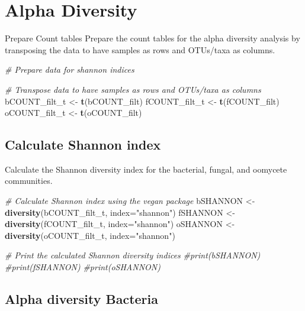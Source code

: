 \documentclass[
  11pt,
]{article}
\newenvironment{Shaded}{\begin{snugshade}}{\end{snugshade}}
\newcommand{\AttributeTok}[1]{\textcolor[rgb]{0.13,0.29,0.53}{#1}}
\newcommand{\CommentTok}[1]{\textcolor[rgb]{0.56,0.35,0.01}{\textit{#1}}}
\newcommand{\FunctionTok}[1]{\textcolor[rgb]{0.13,0.29,0.53}{\textbf{#1}}}
\newcommand{\NormalTok}[1]{#1}
\newcommand{\OtherTok}[1]{\textcolor[rgb]{0.56,0.35,0.01}{#1}}
\newcommand{\StringTok}[1]{\textcolor[rgb]{0.31,0.60,0.02}{#1}}
\begin{document}
\section{Alpha Diversity}\label{alpha-diversity}

Prepare Count tables Prepare the count tables for the alpha diversity
analysis by transposing the data to have samples as rows and OTUs/taxa
as columns.

\begin{Shaded}
\begin{Highlighting}[]
\CommentTok{\# Prepare data for shannon indices}

\CommentTok{\# Transpose data to have samples as rows and OTUs/taxa as columns}
\NormalTok{bCOUNT\_filt\_t }\OtherTok{\textless{}{-}} \FunctionTok{t}\NormalTok{(bCOUNT\_filt)}
\NormalTok{fCOUNT\_filt\_t }\OtherTok{\textless{}{-}} \FunctionTok{t}\NormalTok{(fCOUNT\_filt)}
\NormalTok{oCOUNT\_filt\_t }\OtherTok{\textless{}{-}} \FunctionTok{t}\NormalTok{(oCOUNT\_filt)}
\end{Highlighting}
\end{Shaded}

\subsection{Calculate Shannon index}\label{calculate-shannon-index}

Calculate the Shannon diversity index for the bacterial, fungal, and
oomycete communities.

\begin{Shaded}
\begin{Highlighting}[]
\CommentTok{\# Calculate Shannon index using the vegan package}
\NormalTok{bSHANNON }\OtherTok{\textless{}{-}} \FunctionTok{diversity}\NormalTok{(bCOUNT\_filt\_t, }\AttributeTok{index=}\StringTok{"shannon"}\NormalTok{)}
\NormalTok{fSHANNON }\OtherTok{\textless{}{-}} \FunctionTok{diversity}\NormalTok{(fCOUNT\_filt\_t, }\AttributeTok{index=}\StringTok{"shannon"}\NormalTok{)}
\NormalTok{oSHANNON }\OtherTok{\textless{}{-}} \FunctionTok{diversity}\NormalTok{(oCOUNT\_filt\_t, }\AttributeTok{index=}\StringTok{"shannon"}\NormalTok{)}

\CommentTok{\# Print the calculated Shannon diversity indices}
\CommentTok{\#print(bSHANNON)}
\CommentTok{\#print(fSHANNON)}
\CommentTok{\#print(oSHANNON)}
\end{Highlighting}
\end{Shaded}

\subsection{Alpha diversity Bacteria}\label{alpha-diversity-bacteria}
\end{document}
